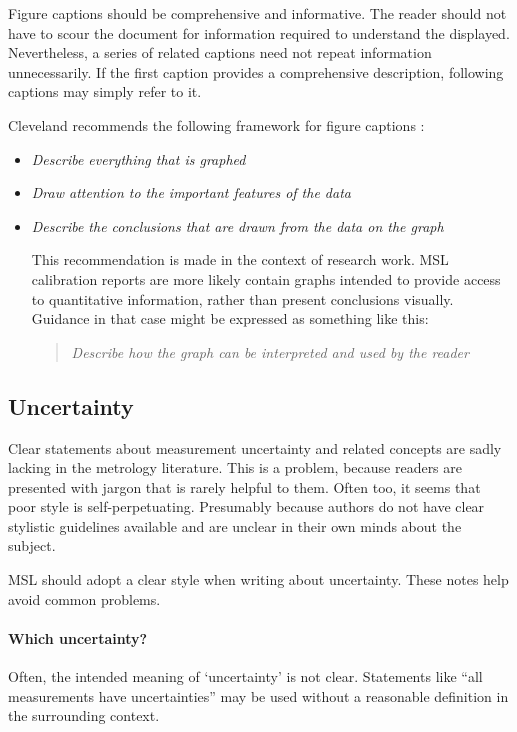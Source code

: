 Figure captions should be comprehensive and informative. The reader should not have to scour the document for information required to understand the displayed. Nevertheless, a series of related captions need not repeat information unnecessarily. If the first caption provides a comprehensive description, following captions may simply refer to it.

Cleveland recommends the following framework for figure captions \cite{Cleveland}:
\begin{itemize}
\item	\textit{Describe everything that is graphed}
\item	\textit{Draw attention to the important features of the data}
\item	\textit{Describe the conclusions that are drawn from the data on the graph}

This recommendation is made in the context of research work. MSL calibration reports are more likely contain graphs intended to provide access to quantitative information, rather than present conclusions visually. Guidance in that case might be expressed as something like this:
\begin{quote}
\textit{Describe how the graph can be interpreted and used by the reader}
\end{quote}

\end{itemize}

\subsection{Uncertainty}
Clear statements about measurement uncertainty and related concepts are sadly lacking in the metrology literature. This is a problem, because readers are presented with jargon that is rarely helpful to them. Often too, it seems that poor style is self-perpetuating. Presumably because authors do not have clear stylistic guidelines available and are unclear in their own minds about the subject. 

MSL should adopt a clear style when writing about uncertainty. These notes help avoid common problems.

\paragraph{Which uncertainty?}
Often, the intended meaning of `uncertainty' is not clear. Statements like ``all measurements have uncertainties'' may be used without a reasonable definition in the surrounding context.

